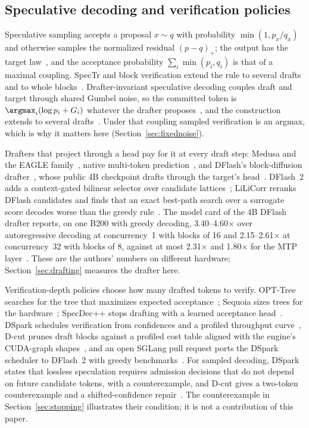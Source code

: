\subsection{Speculative decoding and verification policies}\label{sec:prior-spec}
Speculative sampling accepts a proposal $x\sim q$ with probability $\min(1,p_x/q_x)$ and otherwise samples the normalized residual $(p-q)_+$; the output has the target law~\cite{specdecode,chen2023specsampling}, and the acceptance probability $\sum_i\min(p_i,q_i)$ is that of a maximal coupling. SpecTr and block verification extend the rule to several drafts and to whole blocks~\cite{spectr,blockverify}. Drafter-invariant speculative decoding couples draft and target through shared Gumbel noise, so the committed token is $\argmax_i(\log p_i+G_i)$ whatever the drafter proposes~\cite{daliri2025}, and the construction extends to several drafts~\cite{rowan2025}. Under that coupling sampled verification is an argmax, which is why it matters here (Section~\ref{sec:fixednoise}).

Drafters that project through a head pay for it at every draft step: Medusa and the EAGLE family~\cite{medusa,eagle,eagle2,eagle3}, native multi-token prediction~\cite{gloeckle2024,deepseekv3}, and DFlash's block-diffusion drafter~\cite{dflashpaper}, whose public 4B checkpoint drafts through the target's head~\cite{dflash4bcard}. DFlash~2 adds a context-gated bilinear selector over candidate lattices~\cite{dflash,dflashcard}; LiLiCorr reranks DFlash candidates and finds that an exact best-path search over a surrogate score decodes worse than the greedy rule~\cite{lilicorr}. The model card of the 4B DFlash drafter reports, on one B200 with greedy decoding, 3.40--4.60$\times$ over autoregressive decoding at concurrency~1 with blocks of 16 and 2.15--2.61$\times$ at concurrency~32 with blocks of 8, against at most 2.31$\times$ and 1.80$\times$ for the MTP layer~\cite{dflash4bcard}. These are the authors' numbers on different hardware; Section~\ref{sec:drafting} measures the drafter here.

Verification-depth policies choose how many drafted tokens to verify. OPT-Tree searches for the tree that maximizes expected acceptance~\cite{opttree}; Sequoia sizes trees for the hardware~\cite{sequoia}; SpecDec++ stops drafting with a learned acceptance head~\cite{specdecpp}. DSpark schedules verification from confidences and a profiled throughput curve~\cite{dspark}, D-cut prunes draft blocks against a profiled cost table aligned with the engine's CUDA-graph shapes~\cite{dcut}, and an open SGLang pull request ports the DSpark scheduler to DFlash~2 with greedy benchmarks~\cite{pr36136}. For sampled decoding, DSpark states that lossless speculation requires admission decisions that do not depend on future candidate tokens, with a counterexample, and D-cut gives a two-token counterexample and a shifted-confidence repair~\cite{dspark,dcut}. The counterexample in Section~\ref{sec:stopping} illustrates their condition; it is not a contribution of this paper.

